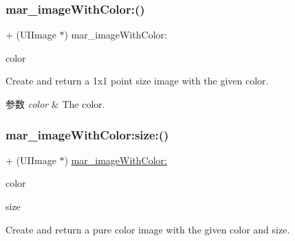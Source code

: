\mbox{\label{category_u_i_image_07_m_a_r_e_x_08_ae3ea71eb9e643ce325e1ff668caee094}} 
\subsubsection{\texorpdfstring{mar\+\_\+image\+With\+Color\+:()}{mar\_imageWithColor:()}}
{\footnotesize\ttfamily + (U\+I\+Image $\ast$) mar\+\_\+image\+With\+Color\+: \begin{DoxyParamCaption}\item[{(U\+I\+Color $\ast$)}]{color }\end{DoxyParamCaption}}

Create and return a 1x1 point size image with the given color.


\begin{DoxyParams}{参数}
{\em color} & The color. \\
\hline
\end{DoxyParams}
\mbox{\label{category_u_i_image_07_m_a_r_e_x_08_a3339593136e1bac6fc9159410ff4ae1d}} 
\subsubsection{\texorpdfstring{mar\+\_\+image\+With\+Color\+:size\+:()}{mar\_imageWithColor:size:()}}
{\footnotesize\ttfamily + (U\+I\+Image $\ast$) \hyperlink{category_u_i_image_07_m_a_r_e_x_08_ae3ea71eb9e643ce325e1ff668caee094}{mar\+\_\+image\+With\+Color\+:} \begin{DoxyParamCaption}\item[{(U\+I\+Color $\ast$)}]{color }\item[{size:(C\+G\+Size)}]{size }\end{DoxyParamCaption}}

Create and return a pure color image with the given color and size.


